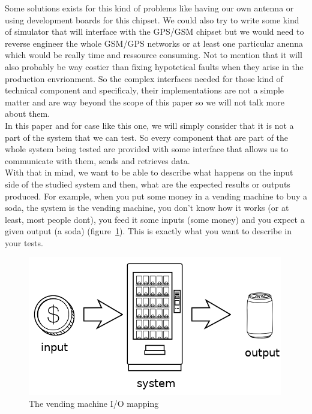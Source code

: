 \documentclass[12pt]{article}
\begin{document}
Some solutions exists for this kind of problems like having our own antenna or using development boards for this chipset. We could also try to write some kind of simulator that will interface with the GPS/GSM chipset but we would need to reverse engineer the whole GSM/GPS networks or at least one particular anenna which would be really time and ressource consuming. Not to mention that it will also probably be way costier than fixing hypotetical faults when they arise in the production envrionment. So the complex interfaces needed for those kind of technical component and specificaly, their implementations are not a simple matter and are way beyond the scope of this paper so we will not talk more about them. \\

In this paper and for case like this one, we will simply consider that it is not a part of the system that we can test. So every component that are part of the whole system being tested are provided with some interface that allows us to communicate with them, sends and retrieves data.\\

With that in mind, we want to be able to describe what happens on the input side of the studied system and then, what are the expected results or outputs produced. For example, when you put some money in a vending machine to buy a soda, the system is the vending machine, you don't know how it works (or at least, most people dont), you feed it some inputs (some money) and you expect a given output (a soda) (figure~\ref{vm-io}). This is exactly what you want to describe in your tests.\\

\begin{figure}
    \centering
    \includegraphics[scale=0.8]{vending-io.png}
    \caption{The vending machine I/O mapping}
    \label{vm-io}
\end{figure}
\end{document}
